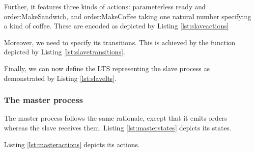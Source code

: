 	\noindent Further, it features three kinds of \textsf{actions}: parameterless \textsf{ready} and \textsf{order:MakeSandwich},
	and \textsf{order:MakeCoffee} taking one natural number specifying a kind of coffee. These are encoded as depicted by
	Listing \ref{lst:slaveactions}

	 	

	\noindent Moreover, we need to specify its transitions. This is achieved by the function depicted
	by Listing \ref{lst:slavetransitions}.

		 	

	\noindent Finally, we can now define the \textsf{LTS} representing the slave process as
	demonstrated by Listing \ref{lst:slavelts}.
	
			 	


\subsubsection{The master process}	
\label{subsub:master}

	The master process follows the same rationale, except that it emits orders whereas the slave
	receives them. Listing \ref{lst:masterstates} depicts its states.
	
			 	

	\noindent Listing \ref{lst:masteractions} depicts its \textsf{actions}.

		

